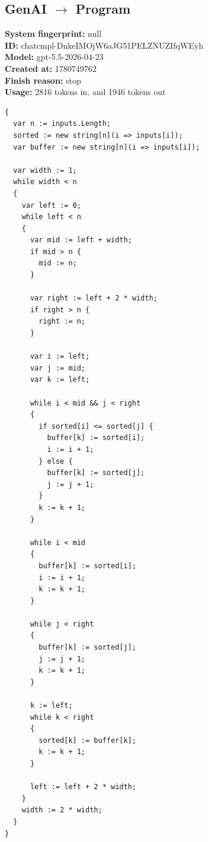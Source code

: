 \documentclass{article}
\begin{document}
\subsection*{GenAI $\rightarrow$ Program}
\textbf{System fingerprint: }null
\\\textbf{ID: }chatcmpl-DnkeIMOjW6aJG51PELZNUZIfqWEyh
\\\textbf{Model: }gpt-5.5-2026-04-23
\\\textbf{Created at: }1780749762
\\\textbf{Finish reason: }stop
\\\textbf{Usage: }2816 tokens in, and 1946 tokens out
\begin{lstlisting}
{
  var n := inputs.Length;
  sorted := new string[n](i => inputs[i]);
  var buffer := new string[n](i => inputs[i]);

  var width := 1;
  while width < n
  {
    var left := 0;
    while left < n
    {
      var mid := left + width;
      if mid > n {
        mid := n;
      }

      var right := left + 2 * width;
      if right > n {
        right := n;
      }

      var i := left;
      var j := mid;
      var k := left;

      while i < mid && j < right
      {
        if sorted[i] <= sorted[j] {
          buffer[k] := sorted[i];
          i := i + 1;
        } else {
          buffer[k] := sorted[j];
          j := j + 1;
        }
        k := k + 1;
      }

      while i < mid
      {
        buffer[k] := sorted[i];
        i := i + 1;
        k := k + 1;
      }

      while j < right
      {
        buffer[k] := sorted[j];
        j := j + 1;
        k := k + 1;
      }

      k := left;
      while k < right
      {
        sorted[k] := buffer[k];
        k := k + 1;
      }

      left := left + 2 * width;
    }
    width := 2 * width;
  }
}
\end{lstlisting}
\end{document}

